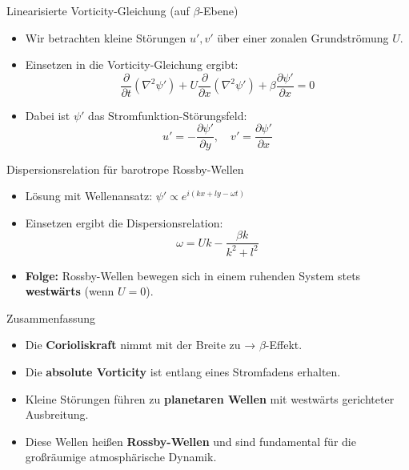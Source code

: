             \begin{frame}{Linearisierte Vorticity-Gleichung (auf \(\beta\)-Ebene)}
            \begin{itemize}
                \item Wir betrachten kleine Störungen \(u', v'\) über einer zonalen Grundströmung \(U\).
                \item Einsetzen in die Vorticity-Gleichung ergibt:
                \[
                \frac{\partial}{\partial t} (\nabla^2 \psi') + U \frac{\partial}{\partial x} (\nabla^2 \psi') + \beta \frac{\partial \psi'}{\partial x} = 0
                \]
                \item Dabei ist \(\psi'\) das Stromfunktion-Störungsfeld:
                \[
                u' = -\frac{\partial \psi'}{\partial y}, \quad v' = \frac{\partial \psi'}{\partial x}
                \]
            \end{itemize}
            \end{frame}
            
            \begin{frame}{Dispersionsrelation für barotrope Rossby-Wellen}
            \begin{itemize}
                \item Lösung mit Wellenansatz: \(\psi' \propto e^{i(kx + ly - \omega t)}\)
                \item Einsetzen ergibt die Dispersionsrelation:
                \[
                \omega = Uk - \frac{\beta k}{k^2 + l^2}
                \]
                \item \textbf{Folge:} Rossby-Wellen bewegen sich in einem ruhenden System stets \textbf{westwärts} (wenn \(U = 0\)).
            \end{itemize}
            \end{frame}
            
            \begin{frame}{Zusammenfassung}
            \begin{itemize}
                \item Die \textbf{Corioliskraft} nimmt mit der Breite zu → \(\beta\)-Effekt.
                \item Die \textbf{absolute Vorticity} ist entlang eines Stromfadens erhalten.
                \item Kleine Störungen führen zu \textbf{planetaren Wellen} mit westwärts gerichteter Ausbreitung.
                \item Diese Wellen heißen \textbf{Rossby-Wellen} und sind fundamental für die großräumige atmosphärische Dynamik.
            \end{itemize}
            \end{frame}
            


